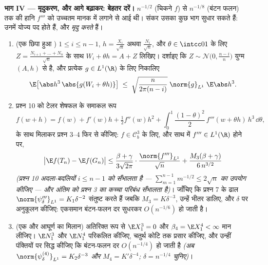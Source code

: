 \begin{problem}[{सप्ताहांत समस्या --- प्रतिस्थापन विधि}]
\medskip
\noindent\textbf{भाग IV --- मृदुकरण, और आगे बढ़ाकर: बेहतर दरें।}
$n^{-1/2}$ (चिकने $f$) से $n^{-1/8}$ (बंटन फलन) तक की हानि $f'''$ को
उच्चतम मानक में लगाने से आई थी। संकर उसका कुछ भाग सुधार सकते हैं:
उनमें  योज्य पद होते हैं, और  \emph{मृदु करते} हैं।
\begin{enumerate}[resume]
  \item (एक छिपा हुआ ) $1 \leq i \leq n - 1$, $h =
        \frac{X_i}{\sqrt n}$ अथवा $\frac{N_i}{\sqrt n}$, और $\theta \in \intcc01$ के
        लिए $Z = \frac{N_{i+1} + \dots + N_n}{\sqrt
        n}$ के साथ $W_i + \theta h = A +
        Z$ लिखिए। दर्शाइए कि $Z \sim \mathcal N\bigl(0,
        \frac{n-i}n\bigr)$ युग्म $(A,
        h)$
        से  है, और प्रत्येक  $g \in
        L^1(\R)$ के लिए निकालिए
        \[
        \E\bigl[\abs h^3\,\abs{g(W_i + \theta h)}\bigr]
        \;\leq\; \sqrt{\frac{n}{2\pi(n - i)}}\;
        \norm{g}_{L^1}\;\E\abs h^3 .
        \]
  \item प्रश्न 10 को टेलर शेषफल के समाकल रूप
        \[
        f(w + h) = f(w) + f'(w)h + \tfrac12f''(w)h^2 +
        \int_0^1\frac{(1 - \theta)^2}2\,f'''(w + \theta
        h)\,h^3\,\dd\theta,
        \]
        के साथ मिलाकर प्रश्न 3--4 फिर से कीजिए: $f \in \mathcal C^3_b$ के लिए, और
        साथ में $f''' \in L^1(\R)$ होने पर,
        \[
        \bigl|\E f(T_n) - \E f(G_n)\bigr| \leq
        \frac{\beta + \gamma}{3\sqrt{2\pi}}\cdot
        \frac{\norm{f'''}_{L^1}}{\sqrt n} +
        \frac{M_3(\beta + \gamma)}{6\,n^{3/2}}
        \]
        \emph{(प्रश्न 10 अदला-बदलियों $i \leq n - 1$ को सँभालता है ---
        $\sum_{m=1}^{n-1}m^{-1/2} \leq 2\sqrt n$ का उपयोग कीजिए --- और अंतिम को प्रश्न 3 का कच्चा
        परिबंध सँभालता है)}। जाँचिए कि प्रश्न 7 के ढाल
        $\norm{\psi_\delta'''}_{L^1} = K_1\delta^{-2}$
        संतुष्ट करते हैं जबकि $M_3 = K\delta^{-3}$, उन्हें भीतर डालिए, और $\delta$
        पर अनुकूलन कीजिए: एकसमान बंटन-फलन दर सुधरकर $O(n^{-1/6})$ हो जाती
        है।
  \item (एक और आघूर्ण का मिलान) अतिरिक्त रूप से $\E
        X_1^3 = 0$ और $\beta_4 = \E X_1^4 < \infty$
        मान लीजिए। $\E N_1^3$ और $\E N_1^4$ परिकलित कीजिए, चतुर्थ कोटि तक
        प्रसार कीजिए, और उन्हीं पंक्तियों पर सिद्ध कीजिए कि
        बंटन-फलन दर $O(n^{-1/4})$ हो जाती है \emph{(अब $\norm{\psi_\delta^{(4)}}_{L^1} =
        K_2\delta^{-3}$ और $M_4 = K'\delta^{-4}$;
        $\delta = n^{-1/4}$ चुनिए)}।

\end{enumerate}
\end{problem}

